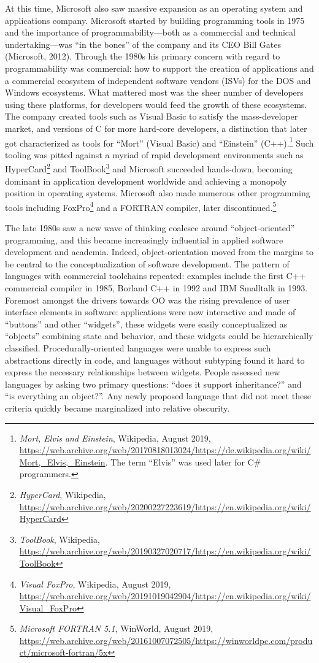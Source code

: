 \documentclass[acmsmall]{acmart}\settopmatter{}
\begin{document}
At this time, Microsoft also saw massive expansion as an operating system and applications company.  Microsoft started by building
programming tools in 1975 and the importance of programmability---both as a commercial and technical undertaking---was “in the bones” of
the company and its CEO Bill Gates (Microsoft, 2012).  Through the 1980s his primary concern with regard to programmability was commercial: how
to support the creation of applications and a commercial ecosystem of independent software vendors (ISVs) for the DOS and
Windows ecosystems.  What mattered most was the sheer number of developers using these platforms, for developers would
feed the growth of these ecosystems.  The company created tools such as Visual Basic to satisfy the mass-developer
market, and versions of C for more hard-core developers, a distinction that later got characterized as
tools for “Mort” (Visual Basic) and “Einstein” (C++).\footnote{ \textit{Mort, Elvis and Einstein}, Wikipedia, August 2019, \url{https://web.archive.org/web/20170818013024/https://de.wikipedia.org/wiki/Mort,_Elvis,_Einstein}.
The term “Elvis” was used later for C\# programmers.}  Such tooling was pitted against a myriad of rapid development
environments such as HyperCard\footnote{\textit{HyperCard}, Wikipedia, \url{https://web.archive.org/web/20200227223619/https://en.wikipedia.org/wiki/HyperCard}}  and
ToolBook\footnote{\textit{ToolBook}, Wikipedia, \url{https://web.archive.org/web/20190327020717/https://en.wikipedia.org/wiki/ToolBook}} and Microsoft succeeded
hands-down, becoming dominant in application development worldwide and achieving a monopoly position in operating
systems.  Microsoft also made numerous other programming tools including FoxPro\footnote{ \textit{Visual FoxPro},
Wikipedia, August 2019, \url{https://web.archive.org/web/20191019042904/https://en.wikipedia.org/wiki/Visual_FoxPro}} and a FORTRAN compiler, later
discontinued.\footnote{\textit{Microsoft FORTRAN 5.1}, WinWorld, August 2019, \url{https://web.archive.org/web/20161007072505/https://winworldpc.com/product/microsoft-fortran/5x}}

The late 1980s saw a new wave of thinking coalesce around “object-oriented” programming, and this became increasingly
influential in applied software development and academia.  Indeed, object-orientation moved from the margins to be central
to the conceptualization of software development.  The pattern of languages with commercial toolchains repeated:
examples include the first C++ commercial compiler in 1985, Borland C++ in 1992 and IBM Smalltalk in 1993.   Foremost
amongst the drivers towards OO was the rising prevalence of user interface elements in software: applications were
now interactive and made of “buttons” and other “widgets”, these widgets were easily conceptualized as “objects” combining
state and behavior, and these widgets could be hierarchically classified. Procedurally-oriented languages were unable
to express such abstractions directly in code, and languages without subtyping found it hard to express the necessary
relationships between widgets. People assessed new languages by asking two primary questions: “does it support inheritance?”
and “is everything an object?”.  Any newly proposed language that did not meet these criteria quickly became marginalized into relative obscurity. 
\end{document}
